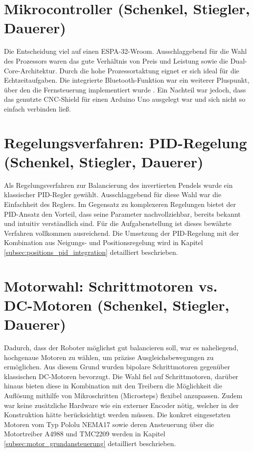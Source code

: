 \documentclass[fontsize=12pt,
parskip=half,	%
department=FakM,  %
logostyle=flat,
twoside, %
DIV=15,BCOR=10mm, %
]{OTHRreprt}
\begin{document}
\section{Mikrocontroller (Schenkel, Stiegler, Dauerer)}
\label{subsec:esp32_designentscheidung}
Die Entscheidung viel auf einen ESPA-32-Wroom. Ausschlaggebend für die Wahl des Prozessors waren das gute Verhältnis von Preis und Leistung sowie die Dual-Core-Architektur. Durch die hohe Prozessortaktung eignet er sich ideal für die Echtzeitaufgaben. 
Die integrierte Bluetooth-Funktion war ein weiterer Pluspunkt, über den die Fernsteuerung implementiert wurde \cite{esp32_wroom_32_datasheet}. Ein Nachteil war jedoch, dass das genutzte CNC-Shield für einen Arduino Uno ausgelegt war und sich nicht so einfach verbinden ließ.


\section{Regelungsverfahren: PID-Regelung (Schenkel, Stiegler, Dauerer)}
\label{sec:pid_designentscheidung}

Als Regelungsverfahren zur Balancierung des invertierten Pendels wurde ein klassischer PID-Regler gewählt. Ausschlaggebend für diese Wahl war die Einfachheit des Reglers. 
Im Gegensatz zu komplexeren Regelungen bietet der PID-Ansatz den Vorteil, dass seine Parameter nachvollziehbar, bereits bekannt und intuitiv verständlich sind. Für die Aufgabenstellung ist dieses bewährte Verfahren vollkommen ausreichend. 
Die Umsetzung der PID-Regelung mit der Kombination aus Neigungs- und Positionsregelung wird in Kapitel \ref{subsec:positions_pid_integration} detailliert beschrieben.



\section{Motorwahl: Schrittmotoren vs. DC-Motoren (Schenkel, Stiegler, Dauerer)}
\label{subsec:motorwahl_designentscheidung}
Dadurch, dass der Roboter möglichst gut balancieren soll, war es naheliegend, hochgenaue Motoren zu wählen, um präzise Ausgleichsbewegungen zu ermöglichen. 
Aus diesem Grund wurden bipolare Schrittmotoren gegenüber klassischen DC-Motoren bevorzugt. Die Wahl fiel auf Schrittmotoren, darüber hinaus bieten diese in Kombination mit den Treibern die Möglichkeit die Auflösung mithilfe von Mikroschritten (Microsteps) flexibel anzupassen. 
Zudem war keine zusätzliche Hardware wie ein externer Encoder nötig, welcher in der Konstruktion hätte berücksichtigt werden müssen. Die konkret eingesetzten Motoren vom Typ Pololu NEMA17 sowie deren Ansteuerung über die Motortreiber A4988 und TMC2209 werden in Kapitel \ref{subsec:motor_grundansteuerung} detailliert beschrieben.
\end{document}
